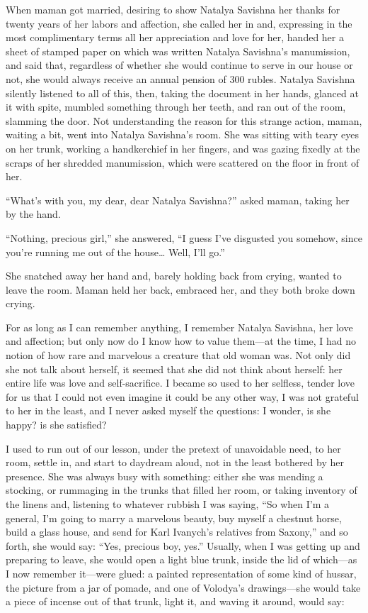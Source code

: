 When maman got married, desiring to show Natalya Savishna her thanks for twenty years of her labors and affection, she called her in and, expressing in the most complimentary terms all her appreciation and love for her, handed her a sheet of stamped paper on which was written Natalya Savishna's manumission, and said that, regardless of whether she would continue to serve in our house or not, she would always receive an annual pension of 300 rubles. Natalya Savishna silently listened to all of this, then, taking the document in her hands, glanced at it with spite, mumbled something through her teeth, and ran out of the room, slamming the door. Not understanding the reason for this strange action, maman, waiting a bit, went into Natalya Savishna's room. She was sitting with teary eyes on her trunk, working a handkerchief in her fingers, and was gazing fixedly at the scraps of her shredded manumission, which were scattered on the floor in front of her.

``What's with you, my dear, dear Natalya Savishna?'' asked maman, taking her by the hand. %

``Nothing, precious girl,'' she answered, ``I guess I've disgusted you somehow, since you're running me out of the house\ldots{} Well, I'll go.'' %

She snatched away her hand and, barely holding back from crying, wanted to leave the room. Maman held her back, embraced her, and they both broke down crying.

For as long as I can remember anything, I remember Natalya Savishna, her love and affection; but only now do I know how to value them---at the time, I had no notion of how rare and marvelous a creature that old woman was. Not only did she not talk about herself, it seemed that she did not think about herself: her entire life was love and self-sacrifice. I became so used to her selfless, tender love for us that I could not even imagine it could be any other way, I was not grateful to her in the least, and I never asked myself the questions: I wonder, is she happy? is she satisfied?

I used to run out of our lesson, under the pretext of unavoidable need, to her room, settle in, and start to daydream aloud, not in the least bothered by her presence. She was always busy with something: either she was mending a stocking, or rummaging in the trunks that filled her room, or taking inventory of the linens and, listening to whatever rubbish I was saying, ``So when I'm a general, I'm going to marry a marvelous beauty, buy myself a chestnut horse, build a glass house, and send for Karl Ivanych's relatives from Saxony,'' and so forth, she would say: ``Yes, precious boy, yes.'' Usually, when I was getting up and preparing to leave, she would open a light blue trunk, inside the lid of which---as I now remember it---were glued: a painted representation of some kind of hussar, the picture from a jar of pomade, and one of Volodya's drawings---she would take a piece of incense out of that trunk, light it, and waving it around, would say:

